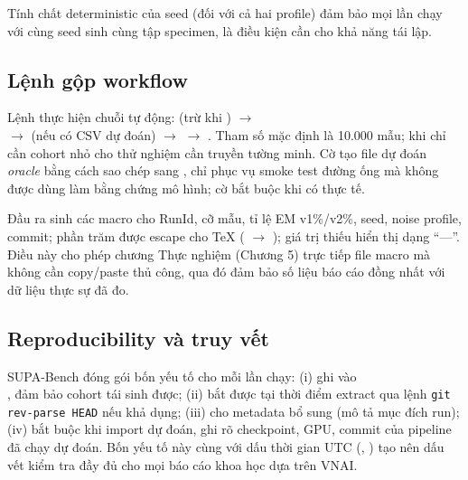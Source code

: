 Tính chất deterministic của seed (đối với cả hai profile) đảm bảo mọi lần chạy với cùng seed sinh cùng tập specimen, là điều kiện cần cho khả năng tái lập.

\subsection{Lệnh gộp workflow}
\label{sec:supa-workflow-cmd}

Lệnh  thực hiện chuỗi tự động:  (trừ khi ) $\to$ \\  $\to$  (nếu có CSV dự đoán) $\to$  $\to$ . Tham số  mặc định là 10.000 mẫu; khi chỉ cần cohort nhỏ cho thử nghiệm cần truyền  tường minh. Cờ  tạo file dự đoán \emph{oracle} bằng cách sao chép  sang , chỉ phục vụ smoke test đường ống mà không được dùng làm bằng chứng mô hình; cờ  bắt buộc khi có  thực tế.

Đầu ra  sinh các macro  cho RunId, cỡ mẫu, tỉ lệ EM v1\%/v2\%, seed, noise profile, commit; phần trăm được escape cho TeX (\macode{\%} $\to$ \macode{\textbackslash\%}); giá trị thiếu hiển thị dạng ``---''. Điều này cho phép chương Thực nghiệm (Chương 5) trực tiếp  file macro mà không cần copy/paste thủ công, qua đó đảm bảo số liệu báo cáo đồng nhất với dữ liệu thực sự đã đo.

\subsection{Reproducibility và truy vết}
\label{sec:reproducibility}

SUPA-Bench đóng gói bốn yếu tố cho mỗi lần chạy: (i)  ghi vào \\ , đảm bảo cohort tái sinh được; (ii)  bắt được tại thời điểm extract qua lệnh \texttt{git rev-parse HEAD} nếu khả dụng; (iii)  cho metadata bổ sung (mô tả mục đích run); (iv) bắt buộc  khi import dự đoán, ghi rõ checkpoint, GPU, commit của pipeline đã chạy dự đoán. Bốn yếu tố này cùng với dấu thời gian UTC (, ) tạo nên dấu vết kiểm tra đầy đủ cho mọi báo cáo khoa học dựa trên VNAI.

